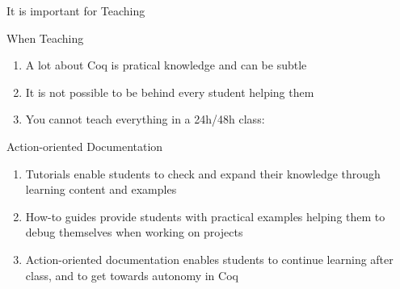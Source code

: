 \documentclass[10pt]{beamer}
\begin{document}
\begin{frame}{It is important for Teaching}
  \begin{tcbProp}{When Teaching}
    \begin{enumerate}
      \item<1-> A lot about Coq is pratical knowledge and can be subtle
      \item<1-> It is not possible to be behind every student helping them
      \item<1-> You cannot teach everything in a 24h/48h class:
    \end{enumerate}
  \end{tcbProp}
  \begin{tcbSol}{Action-oriented Documentation}
    \begin{enumerate}
      \item<2-> Tutorials enable students to check and expand their knowledge
            through learning content and examples
      \item<3-> How-to guides provide students with practical examples helping them
            to debug themselves when working on projects
      \item<4-> Action-oriented documentation enables students to continue
            learning after class, and to get towards autonomy in Coq
    \end{enumerate}
  \end{tcbSol}
\end{frame}
\end{document}
